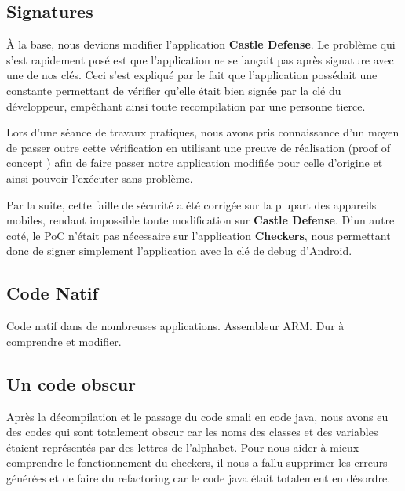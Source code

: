 \subsection{Signatures}

À la base, nous devions modifier l'application \textbf{Castle Defense}.
Le problème qui s'est rapidement posé est que l'application ne se lançait pas après signature avec une de nos clés.
Ceci s'est expliqué par le fait que l'application possédait une constante permettant de vérifier qu'elle était bien signée par la clé du développeur,
empêchant ainsi toute recompilation par une personne tierce.

Lors d'une séance de travaux pratiques, nous avons pris connaissance d'un moyen de passer outre cette vérification en utilisant une preuve de réalisation
(proof of concept \cite{PoC}) afin de faire passer notre application modifiée pour celle d'origine et ainsi pouvoir l'exécuter sans problème.

Par la suite, cette faille de sécurité a été corrigée sur la plupart des appareils mobiles,
rendant impossible toute modification sur \textbf{Castle Defense}.
D'un autre coté, le PoC n'était pas nécessaire sur l'application \textbf{Checkers},
nous permettant donc de signer simplement l'application avec la clé de debug d'Android.


\subsection{Code Natif}

Code natif dans de nombreuses applications.
Assembleur ARM.
Dur à comprendre et modifier.


\subsection{Un code obscur}

Après la décompilation et le passage du code smali en code java, nous avons eu des codes qui sont totalement obscur car les noms des classes et des variables étaient représentés par des lettres de l’alphabet.
Pour nous aider à mieux comprendre le fonctionnement du checkers, il nous a fallu supprimer les erreurs générées et de faire du refactoring car le code java était totalement en désordre.